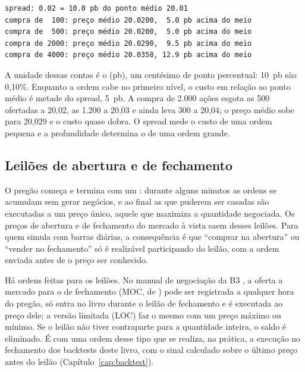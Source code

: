 
\begin{lstlisting}[style=saida]
spread: 0.02 = 10.0 pb do ponto médio 20.01
compra de  100: preço médio 20.0200,  5.0 pb acima do meio
compra de  500: preço médio 20.0200,  5.0 pb acima do meio
compra de 2000: preço médio 20.0290,  9.5 pb acima do meio
compra de 4000: preço médio 20.0358, 12.9 pb acima do meio
\end{lstlisting}

A unidade dessas contas é o  (pb), um centésimo de ponto percentual: 10~pb são 0,10\%. Enquanto a ordem cabe no primeiro nível, o custo em relação ao ponto médio é metade do spread, 5~pb. A compra de 2.000 ações esgota as 500 ofertadas a 20,02, as 1.200 a 20,03 e ainda leva 300 a 20,04; o preço médio sobe para 20,029 e o custo quase dobra. O spread mede o custo de uma ordem pequena e a profundidade determina o de uma ordem grande.

\subsection{Leilões de abertura e de fechamento}

O pregão começa e termina com um : durante alguns minutos as ordens se acumulam sem gerar negócios, e ao final as que puderem ser casadas são executadas a um preço único, aquele que maximiza a quantidade negociada. Os preços de abertura e de fechamento do mercado à vista saem desses leilões. Para quem simula com barras diárias, a consequência é que ``comprar na abertura'' ou ``vender no fechamento'' só é realizável participando do leilão, com a ordem enviada antes de o preço ser conhecido.

Há ordens feitas para os leilões. No manual de negociação da B3 \citep{b3mpo}, a oferta a mercado para o  de fechamento (MOC, de ) pode ser registrada a qualquer hora do pregão, só entra no livro durante o leilão de fechamento e é executada ao preço dele; a versão limitada (LOC) faz o mesmo com um preço máximo ou mínimo. Se o leilão não tiver contraparte para a quantidade inteira, o saldo é eliminado. É com uma ordem desse tipo que se realiza, na prática, a execução no fechamento dos backtests deste livro, com o sinal calculado sobre o último preço antes do leilão (Capítulo~\ref{cap:backtest}).

